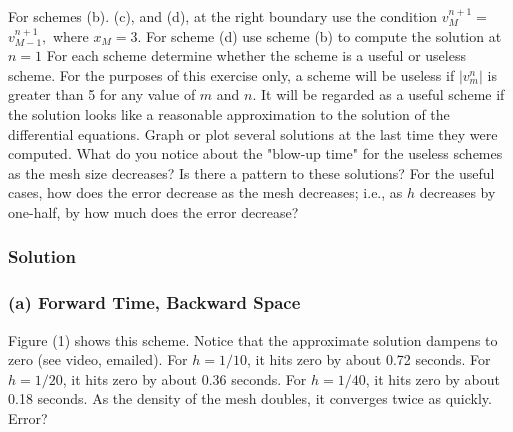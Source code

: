 \documentclass[12pt]{article}
\begin{document}
For schemes (b). (c), and (d), at the right boundary use the condition $v_{M}^{n+1}=$ $v_{M-1}^{n+1},$ where $x_{M}=3 .$ For scheme (d) use scheme (b) to compute the solution at $n=1$
For each scheme determine whether the scheme is a useful or useless scheme. For the purposes of this exercise only, a scheme will be useless if $\left|v_{m}^{n}\right|$ is greater than
5 for any value of $m$ and $n .$ It will be regarded as a useful scheme if the solution looks like a reasonable approximation to the solution of the differential equations. Graph or plot several solutions at the last time they were computed. What do you notice about the "blow-up time" for the useless schemes as the mesh size decreases? Is there a pattern to these solutions? For the useful cases, how does the error decrease
as the mesh decreases; i.e., as $h$ decreases by one-half, by how much does the error decrease?

\subsubsection*{Solution}

\subsubsection*{(a) Forward Time, Backward Space}

Figure (1) shows this scheme. Notice that the approximate solution dampens to zero (see video, emailed). For $h=1/10$, it hits zero by about 0.72 seconds. For $h=1/20$, it hits zero by about 0.36 seconds. For $h=1/40$, it hits zero by about 0.18 seconds. As the density of the mesh doubles, it converges twice as quickly. Error?
\end{document}
